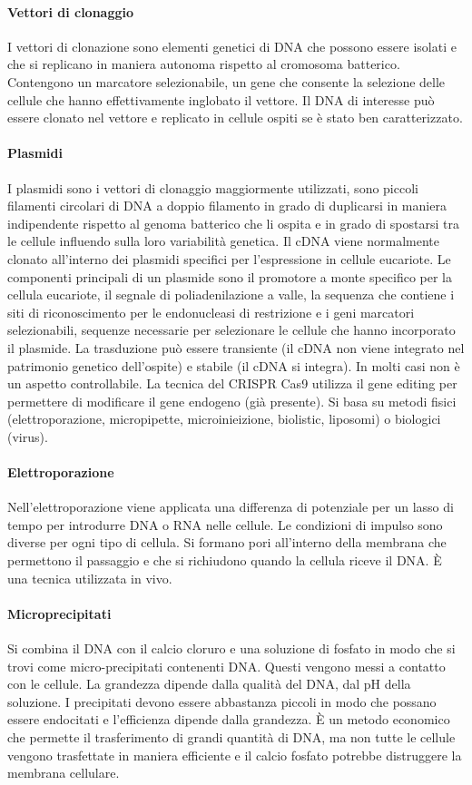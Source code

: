 \paragraph{Vettori di clonaggio}
I vettori di clonazione sono elementi genetici di DNA che possono essere isolati e che si replicano in maniera autonoma rispetto al cromosoma batterico. Contengono un marcatore 
selezionabile, un gene che consente la selezione delle cellule che hanno effettivamente inglobato il vettore. Il DNA di interesse pu\`o essere clonato nel vettore e replicato in cellule
ospiti se \`e stato ben caratterizzato. 
\paragraph{Plasmidi}
I plasmidi sono i vettori di clonaggio maggiormente utilizzati, sono piccoli filamenti circolari di DNA a doppio filamento in grado di duplicarsi in maniera indipendente rispetto al 
genoma batterico che li ospita e in grado di spostarsi tra le cellule influendo sulla loro variabilit\`a genetica. Il cDNA viene normalmente clonato all'interno dei plasmidi specifici 
per l'espressione in cellule eucariote. Le componenti principali di un plasmide sono il promotore a monte specifico per la cellula eucariote, il segnale di poliadenilazione a valle, la
sequenza che contiene i siti di riconoscimento per le endonucleasi di restrizione e i geni marcatori selezionabili, sequenze necessarie per selezionare le cellule che hanno incorporato 
il plasmide. La trasduzione pu\`o essere transiente (il cDNA non viene integrato nel patrimonio genetico dell'ospite) e stabile (il cDNA si integra). In molti casi non \`e un aspetto
controllabile. La tecnica del CRISPR Cas9 utilizza il gene editing per permettere di modificare il gene endogeno (gi\`a presente). Si basa su metodi fisici (elettroporazione,
micropipette, microinieizione, biolistic, liposomi) o biologici (virus). 
\paragraph{Elettroporazione}
Nell'elettroporazione viene applicata una differenza di potenziale per un lasso di tempo per introdurre DNA o RNA nelle cellule. Le condizioni di impulso sono diverse per ogni tipo di 
cellula. Si formano pori all'interno della membrana che permettono il passaggio e che si richiudono quando la cellula riceve il DNA. \`E una tecnica utilizzata in vivo.
\paragraph{Microprecipitati}
Si combina il DNA con il calcio cloruro e una soluzione di fosfato in modo che si trovi come micro-precipitati contenenti DNA. Questi vengono messi a contatto con le cellule. La 
grandezza dipende dalla qualit\`a del DNA, dal pH della soluzione. I precipitati devono essere abbastanza piccoli in modo che possano essere endocitati e l'efficienza dipende dalla 
grandezza. \`E un metodo economico che permette il trasferimento di grandi quantit\`a di DNA, ma non tutte le cellule vengono trasfettate in maniera efficiente e il calcio fosfato 
potrebbe distruggere la membrana cellulare. 
